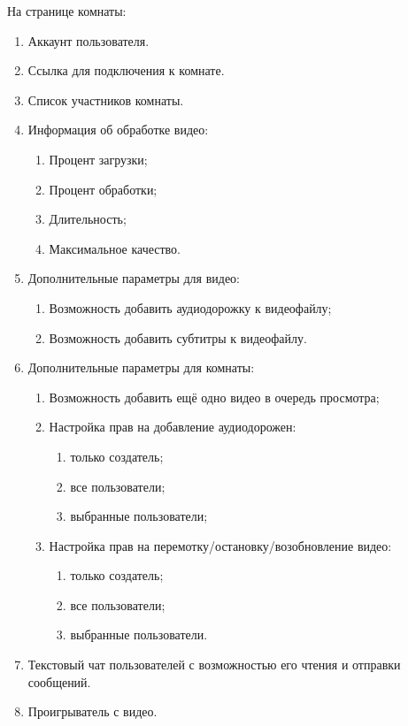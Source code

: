 На странице комнаты:
\begin{enumerate}[noitemsep]
    \item Аккаунт пользователя.
    \item Ссылка для подключения к комнате.
    \item Список участников комнаты.
    \item Информация об обработке видео:
    \begin{enumerate}
        \item Процент загрузки;
        \item Процент обработки;
        \item Длительность;
        \item Максимальное качество.
    \end{enumerate}
    \item Дополнительные параметры для видео:
    \begin{enumerate}
        \item Возможность добавить аудиодорожку к видеофайлу;
        \item Возможность добавить субтитры к видеофайлу.
    \end{enumerate}
    \item Дополнительные параметры для комнаты:
    \begin{enumerate}
        \item Возможность добавить ещё одно видео в очередь просмотра;
        \item Настройка прав на добавление аудиодорожен:
        \begin{enumerate}
            \item только создатель;
            \item все пользователи;
            \item выбранные пользователи;
        \end{enumerate}
        \item Настройка прав на перемотку/остановку/возобновление видео:
        \begin{enumerate}
            \item только создатель;
            \item все пользователи;
            \item выбранные пользователи.
        \end{enumerate}
    \end{enumerate}
    \item Текстовый чат пользователей с возможностью его чтения и отправки сообщений.
    \item Проигрыватель с видео.
\end{enumerate}

